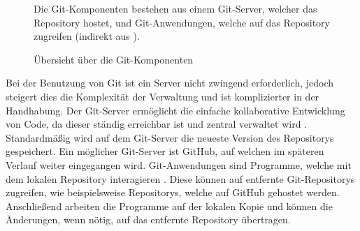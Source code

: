 \begin{figure}
    {
        \centering
        \caption{Übersicht über die Git-Komponenten}
        \label{fig:git}
        \small
        \raggedright
        Die Git-Komponenten bestehen aus einem Git-Server, welcher das Repository hostet, und Git-Anwendungen, welche auf das Repository zugreifen (indirekt aus \cite{ponuthorai_version_2022}).
    }
\end{figure}

Bei der Benutzung von Git ist ein Server nicht zwingend erforderlich, jedoch steigert dies die Komplexität der Verwaltung und ist komplizierter in der Handhabung.
Der Git-Server ermöglicht die einfache kollaborative Entwicklung von Code, da dieser ständig erreichbar ist und zentral verwaltet wird \autocite{ponuthorai_version_2022}.
Standardmäßig wird auf dem Git-Server die neueste Version des Repositorys gespeichert.
Ein möglicher Git-Server ist GitHub, auf welchen im späteren Verlauf weiter eingegangen wird.
Git-Anwendungen sind Programme, welche mit dem lokalen Repository interagieren \autocite{ponuthorai_version_2022}.
Diese können auf entfernte Git-Repositorys zugreifen, wie beispielsweise Repositorys, welche auf GitHub gehostet werden.
Anschließend arbeiten die Programme auf der lokalen Kopie und können die Änderungen, wenn nötig, auf das entfernte Repository übertragen.

